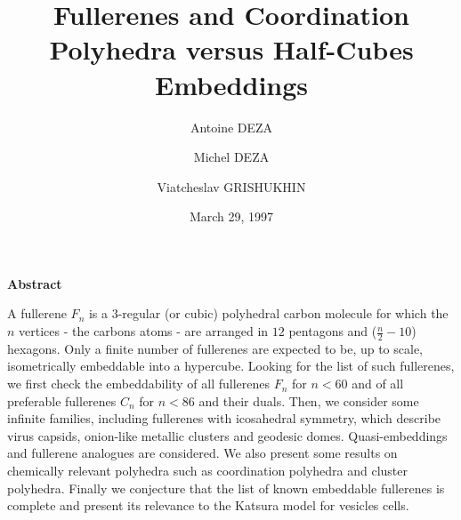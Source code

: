 \renewcommand{\baselinestretch}{1.07}
\setlength{\oddsidemargin}{0mm}
\setlength{\textwidth}{16.8cm}
\setlength{\topmargin}{-16mm}
\setlength{\topmargin}{0mm}
\setlength{\textheight}{25cm}
\setlength{\headsep}{0in}
\setlength{\headheight}{0pt}
\pagestyle{empty}
\renewcommand{\thefootnote}{}

\newenvironment{proof}
{\begin{rm}\par\smallskip\noindent{\sc Proof.}\quad}{\hfill$\Box$\end{rm}}

\def\theequation{\arabic{section}.\arabic{equation}}
\def\thefigure{\arabic{section}.\arabic{figure}}
\newtheorem{theorem}{Theorem}[section]
\newtheorem{lemma}[theorem]{Lemma}             %
\newtheorem{remark}[theorem]{Remark}           %
\newtheorem{proposition}[theorem]{Proposition} %
\newtheorem{corollary}[theorem]{Corollary}     %
\newtheorem{property}[theorem]{Property}       %
\newtheorem{conjecture}[theorem]{Conjecture}   %



\title{\bf 
Fullerenes and Coordination Polyhedra versus Half-Cubes Embeddings\\ $\:$}
\author {Antoine DEZA
\and
Michel DEZA
\and
Viatcheslav GRISHUKHIN}

\vspace{1cm}
\date{March 29, 1997}
\maketitle

\begin{center}
{\bf Abstract}
\end{center}
A fullerene $F_n$ is a $3$-regular (or cubic) polyhedral carbon molecule 
for which the $n$ vertices - the carbons atoms -
are arranged in $12$ pentagons and ($\frac{n}{2}-10$) hexagons.
Only a finite number of fullerenes are expected to be, up to scale, isometrically embeddable 
into a hypercube.
Looking for the list of such fullerenes, we first check the embeddability of
all fullerenes $F_n$ for $n<60$
and of all preferable fullerenes $C_n$ for $n<86$ and their duals. 
Then, we consider some infinite families, including fullerenes with icosahedral 
symmetry, which describe
virus capsids, onion-like metallic clusters and geodesic domes.
Quasi-embeddings and fullerene analogues are considered.
We also present some results on chemically relevant polyhedra such as coordination
polyhedra and cluster polyhedra.
Finally we conjecture that the list of known embeddable fullerenes is complete and present 
its relevance to the Katsura model for vesicles cells.\\

